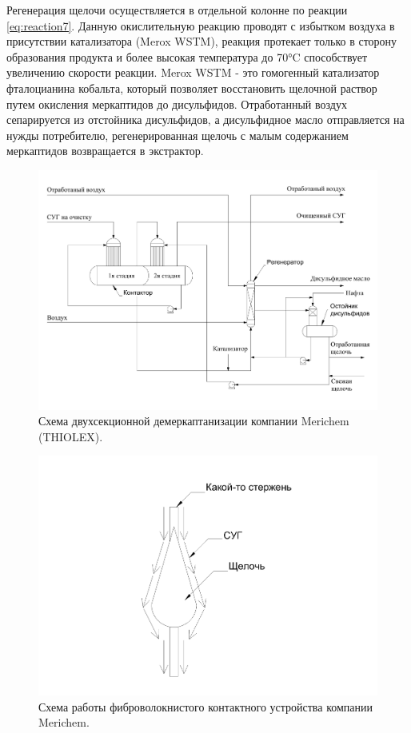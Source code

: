 Регенерация щелочи осуществляется в отдельной колонне по реакции \cref{eq:reaction7}. Данную окислительную реакцию проводят с избытком воздуха в присутствии катализатора (Merox WSTM), реакция протекает только в сторону образования продукта и более высокая температура до \num{70}°C способствует увеличению скорости реакции. Merox WSTM - это гомогенный катализатор фталоцианина кобальта, который позволяет восстановить щелочной раствор путем окисления меркаптидов до дисульфидов. Отработанный воздух сепарируется из отстойника дисульфидов, а дисульфидное масло отправляется на нужды потребителю, регенерированная щелочь с малым содержанием меркаптидов возвращается в экстрактор.

\begin{figure}
	\centering
	\includegraphics[width=1\linewidth]{images/Eth}
	\caption{Схема двухсекционной демеркаптанизации компании Merichem (THIOLEX).}
	\label{fig:THIOLEX}
\end{figure}

\begin{figure}
	\centering
	\includegraphics[width=0.6\linewidth]{images/fibr}
	\caption{Схема работы фиброволокнистого контактного устройства компании Merichem.}
	\label{fig:FIBERFILM}
\end{figure}

